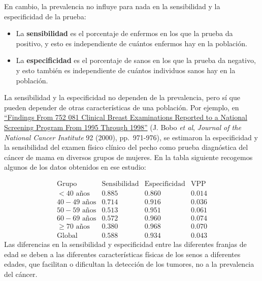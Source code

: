 \documentclass[
]{book}
\theoremstyle{definition}
\theoremstyle{definition}
\theoremstyle{definition}
\theoremstyle{definition}
\theoremstyle{remark}
\begin{document}
En cambio, la prevalencia no influye para nada en la sensibilidad y la especificidad de la prueba:

\begin{itemize}
\item
  La \textbf{sensibilidad} es el porcentaje de enfermos en los que la prueba da positivo, y esto es independiente de cuántos enfermos hay en la población.
\item
  La \textbf{especificidad} es el porcentaje de sanos en los que la prueba da negativo, y esto también es independiente de cuántos individuos sanos hay en la población.
\end{itemize}

\begin{rmdnote}
La sensibilidad y la especificidad no dependen de la prevalencia, pero sí que pueden depender de otras características de una población. Por ejemplo, en \href{https://academic.oup.com/jnci/article/92/12/971/2905789}{``Findings From 752 081 Clinical Breast Examinations Reported to a National Screening Program From 1995 Through 1998''} (J. Bobo \emph{et al}, \emph{Journal of the National Cancer Institute} 92 (2000), pp.~971-976), se estimaron la especificidad y la sensibilidad del examen físico clínico del pecho como prueba diagnóstica del cáncer de mama en diversos grupos de mujeres. En la tabla siguiente recogemos algunos de los datos obtenidos en ese estudio:
\end{rmdnote}

\[
\begin{array}{l|ccc}
\text{Grupo} & \text{Sensibilidad} & \text{Especificidad} & \text{VPP}  \\ \hline
<40\text{ años} & 0.885 & 0.860 & 0.014  \\
40-49\text{ años} & 0.714 & 0.916 & 0.036 \\
50-59\text{ años} & 0.513 & 0.951 & 0.061 \\
60-69\text{ años} & 0.572 & 0.960 & 0.074 \\
\geqslant 70\text{ años} & 0.380 & 0.968 & 0.070  \\  \hline
\text{Global} & 0.588 & 0.934 & 0.043  
\end{array}
\]
Las diferencias en la sensibilidad y especificidad entre las diferentes franjas de edad se deben a las diferentes características físicas de los senos a diferentes edades, que facilitan o dificultan la detección de los tumores, no a la prevalencia del cáncer.
\end{document}
